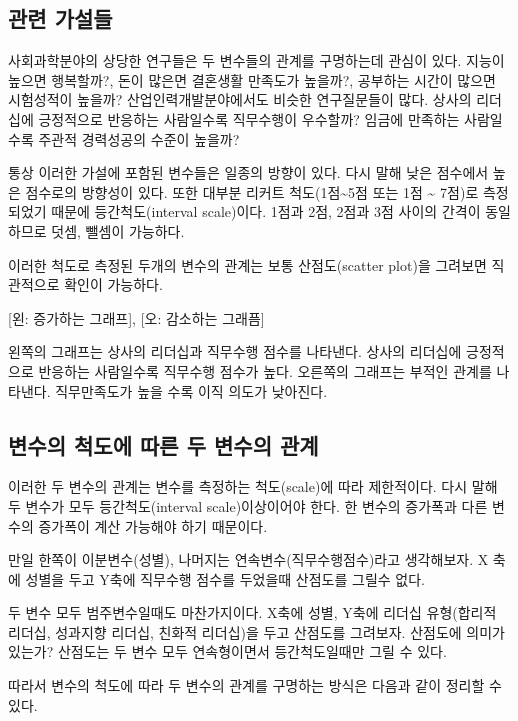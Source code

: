 \documentclass[
]{book}
\begin{document}
\subsection{관련 가설들}\label{uxad00uxb828-uxac00uxc124uxb4e4}

사회과학분야의 상당한 연구들은 두 변수들의 관계를 구명하는데 관심이 있다. 지능이 높으면 행복할까?, 돈이 많은면 결혼생활 만족도가 높을까?, 공부하는 시간이 많으면 시험성적이 높을까?
산업인력개발분야에서도 비슷한 연구질문들이 많다. 상사의 리더십에 긍정적으로 반응하는 사람일수록 직무수행이 우수할까? 임금에 만족하는 사람일수록 주관적 경력성공의 수준이 높을까?

통상 이러한 가설에 포함된 변수들은 일종의 방향이 있다. 다시 말해 낮은 점수에서 높은 점수로의 방향성이 있다. 또한 대부분 리커트 척도(1점\textasciitilde5점 또는 1점 \textasciitilde{} 7점)로 측정되었기 때문에 등간척도(interval scale)이다. 1점과 2점, 2점과 3점 사이의 간격이 동일하므로 덧셈, 뺄셈이 가능하다.

이러한 척도로 측정된 두개의 변수의 관계는 보통 산점도(scatter plot)을 그려보면 직관적으로 확인이 가능하다.

{[}왼: 증가하는 그래프{]}, {[}오: 감소하는 그래픔{]}

왼쪽의 그래프는 상사의 리더십과 직무수행 점수를 나타낸다. 상사의 리더십에 긍정적으로 반응하는 사람일수록 직무수행 점수가 높다. 오른쪽의 그래프는 부적인 관계를 나타낸다. 직무만족도가 높을 수록 이직 의도가 낮아진다.

\subsection{변수의 척도에 따른 두 변수의 관계}\label{uxbcc0uxc218uxc758-uxcc99uxb3c4uxc5d0-uxb530uxb978-uxb450-uxbcc0uxc218uxc758-uxad00uxacc4}

이러한 두 변수의 관계는 변수를 측정하는 척도(scale)에 따라 제한적이다. 다시 말해 두 변수가 모두 등간척도(interval scale)이상이어야 한다. 한 변수의 증가폭과 다른 변수의 증가폭이 계산 가능해야 하기 때문이다.

만일 한쪽이 이분변수(성별), 나머지는 연속변수(직무수행점수)라고 생각해보자. X 축에 성별을 두고 Y축에 직무수행 점수를 두었을때 산점도를 그릴수 없다.

두 변수 모두 범주변수일때도 마찬가지이다. X축에 성별, Y축에 리더십 유형(합리적 리더십, 성과지향 리더십, 친화적 리더십)을 두고 산점도를 그려보자. 산점도에 의미가 있는가? 산점도는 두 변수 모두 연속형이면서 등간척도일때만 그릴 수 있다.

따라서 변수의 척도에 따라 두 변수의 관계를 구명하는 방식은 다음과 같이 정리할 수 있다.
\end{document}
